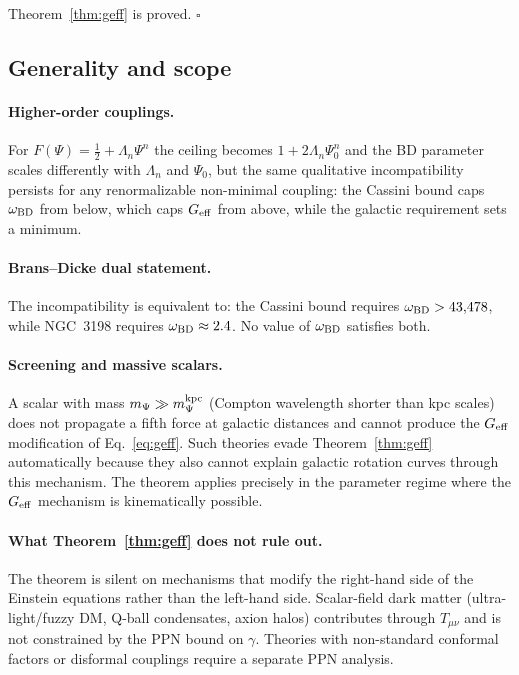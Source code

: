\documentclass[12pt,a4paper]{article}
\theoremstyle{plain}
\newcommand{\Geff}{G_{\rm eff}}
\newcommand{\obd}{\omega_{\rm BD}}
\begin{document}
Theorem~\ref{thm:geff} is proved. \qquad $\square$

\subsection{Generality and scope}
\label{sec:geff_gen}

\paragraph{Higher-order couplings.}
For $F(\Psi) = \tfrac{1}{2} + \Lambda_n\Psi^n$ the ceiling becomes $1 +
2\Lambda_n\Psi_0^n$ and the BD parameter scales differently with
$\Lambda_n$ and $\Psi_0$, but the same qualitative incompatibility
persists for any renormalizable non-minimal coupling: the Cassini bound
caps $\obd$ from below, which caps $G_{\rm eff}$ from above, while the
galactic requirement sets a minimum.

\paragraph{Brans--Dicke dual statement.}
The incompatibility is equivalent to: the Cassini bound requires
$\obd > 43{,}478$, while NGC~3198 requires $\obd \approx 2.4$.
No value of $\obd$ satisfies both.

\paragraph{Screening and massive scalars.}
A scalar with mass $m_\Psi \gg m_\Psi^{\rm kpc}$ (Compton wavelength
shorter than kpc scales) does not propagate a fifth force at galactic
distances and cannot produce the $\Geff$ modification of
Eq.~\eqref{eq:geff}.  Such theories evade Theorem~\ref{thm:geff}
automatically because they also cannot explain galactic rotation curves
through this mechanism.  The theorem applies precisely in the parameter
regime where the $\Geff$ mechanism is kinematically possible.

\paragraph{What Theorem~\ref{thm:geff} does not rule out.}
The theorem is silent on mechanisms that modify the right-hand side of the
Einstein equations rather than the left-hand side.  Scalar-field dark
matter (ultra-light/fuzzy DM, Q-ball condensates, axion halos) contributes
through $T_{\mu\nu}$ and is not constrained by the PPN bound on $\gamma$.
Theories with non-standard conformal factors or disformal couplings require
a separate PPN analysis.
\end{document}
